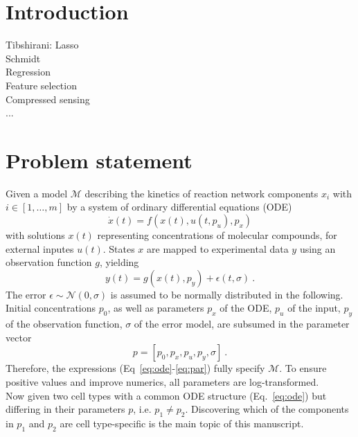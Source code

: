 \documentclass{bioinfo}
\begin{document}
\maketitle

\section{Introduction}

Tibshirani: Lasso\\
Schmidt\\
Regression\\
Feature selection\\
Compressed sensing\\
...



\section{Problem statement}

Given a model $\mathcal M$ describing the kinetics of reaction network components $x_i$ with $i \in [1,\dots,m]$ by a system of ordinary differential equations (ODE)
\begin{equation}
\dot x(t) = f(x(t),u(t,p_u),p_x)\label{eq:ode}
\end{equation}
with solutions $x(t)$ representing concentrations of molecular compounds, for external inputes $u(t)$.
States $x$ are mapped to experimental data $y$ using an observation function $g$, yielding
\begin{equation}
y(t) = g(x(t),p_y)+\epsilon(t,\sigma) \:.\label{eq:obs}
\end{equation}
The error $\epsilon \sim \mathcal N(0,\sigma)$ is assumed to be normally distributed in the following.
Initial concentrations $p_0$, as well as parameters $p_x$ of the ODE, $p_u$ of the input, $p_y$ of the observation function, $\sigma$ of the error model, are subsumed in the parameter vector
\begin{equation}
p = [p_0, p_x, p_u, p_y, \sigma] \:.\label{eq:par}
\end{equation}
Therefore, the expressions (Eq~\ref{eq:ode}-\ref{eq:par}) fully specify $\mathcal M$.
To ensure positive values and improve numerics, all parameters are log-transformed.\\
Now given two cell types with a common ODE structure (Eq.~\ref{eq:ode}) but differing in their parameters $p$, i.e. $p_1 \neq p_2$.
Discovering which of the components in $p_1$ and $p_2$ are cell type-specific is the main topic of this manuscript.
\end{document}

